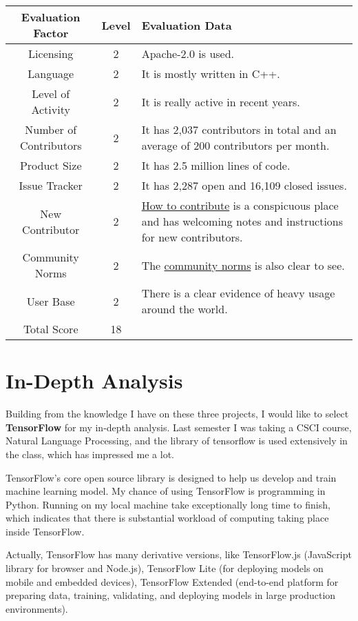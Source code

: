 \documentclass[11pt]{article}
\begin{document}
\begin{tabular}{|c|c|p{4in}|} 
\hline
Evaluation Factor & Level & Evaluation Data \\
\hline
Licensing & 2 & Apache-2.0 is used.\\
\hline
Language & 2 & It is mostly written in C++.\\
\hline
Level of Activity & 2 & It is really active in recent years.\\
\hline
Number of Contributors & 2 & It has 2,037 contributors in total and an average of 200 contributors per month.\\
\hline
Product Size & 2 & It has 2.5 million lines of code.\\
\hline
Issue Tracker & 2 & It has 2,287 open and 16,109 closed issues.\\
\hline
New Contributor & 2 & \href{https://www.tensorflow.org/community/contribute}{How to contribute} is a conspicuous place and has welcoming notes and instructions for new contributors.\\
\hline
Community Norms & 2 & The \href{https://www.tensorflow.org/community}{community norms} is also clear to see.\\
\hline
User Base & 2 & There is a clear evidence of heavy usage around the world.\\
\hline
Total Score & 18 & \\
\hline
\end{tabular}

\section*{In-Depth Analysis}

Building from the knowledge I have on these three projects, I would like to select \textbf{TensorFlow} for my in-depth analysis. Last semester I was taking a CSCI course, Natural Language Processing, and the library of tensorflow is used extensively in the class, which has impressed me a lot.

TensorFlow's core open source library is designed to help us develop and train machine learning model. My chance of using TensorFlow is programming in Python. Running on my local machine take exceptionally long time to finish, which indicates that there is substantial workload of computing taking place inside TensorFlow.

Actually, TensorFlow has many derivative versions, like TensorFlow.js (JavaScript library for browser and Node.js), TensorFlow Lite (for deploying models on mobile and embedded devices), TensorFlow Extended (end-to-end platform for preparing data, training, validating, and deploying models in large production environments).
\end{document}
